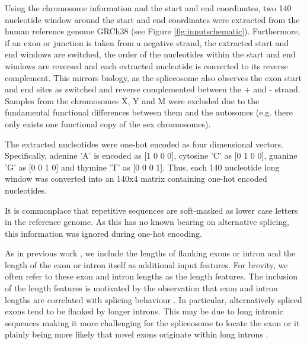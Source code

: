 Using the chromosome information and the start and end coordinates, two 140 nucleotide window around the start and end coordinates were extracted from the human reference genome GRCh38 (see Figure \ref{fig:inputschematic}). Furthermore, if an exon or junction is taken from a negative strand, the extracted start and end windows are switched, the order of the nucleotides within the start and end windows are reversed and each extracted nucleotide is converted to its reverse complement. This mirrors biology, as the spliceosome also observes the exon start and end sites as switched and reverse complemented between the + and - strand.\\ 
Samples from the chromosomes X, Y and M were excluded due to the fundamental functional differences between them and the autosomes (e.g. there only exists one functional copy of the sex chromosomes).

The extracted nucleotides were one-hot encoded as four dimensional vectors. Specifically, adenine 'A' is encoded as [1 0 0 0], cytosine 'C' as [0 1 0 0], guanine 'G' as [0 0 1 0] and thymine 'T' as [0 0 0 1]. Thus, each 140 nucleotide long window was converted into an 140x4 matrix containing one-hot encoded nucleotides.

It is commonplace that repetitive sequences are soft-masked as lower case letters in the reference genome. As this has no known bearing on alternative splicing, this information was ignored during one-hot encoding.

As in previous work \cite{dsc} \cite{flawed4}, we include the lengths of flanking exons or intron and the length of the exon or intron itself as additional input features. For brevity, we often refer to these exon and intron lengths as the length features. The inclusion of the length features is motivated by the observation that exon and intron lengths are correlated with splicing behaviour \cite{lengthsref1} \cite{lengthsref2}. In particular, alternatively spliced exons tend to be flanked by longer introns. This may be due to long intronic sequences making it more challenging for the spliceosome to locate the exon or it plainly being more likely that novel exons originate within long introns \cite{bestlengthsref}. 


